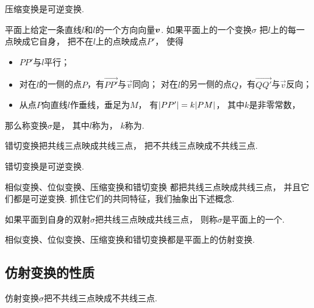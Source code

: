 \begin{proposition}
压缩变换是可逆变换.
\end{proposition}

\begin{definition}
平面上给定一条直线\(l\)和\(l\)的一个方向向量\(\boldsymbol{v}\).
如果平面上的一个变换\(\sigma\)
把\(l\)上的每一点映成它自身，
把不在\(l\)上的点映成点\(P'\)，
使得\begin{itemize}
	\item \(PP'\)与\(l\)平行；
	\item 对在\(l\)的一侧的点\(P\)，有\(\vec{PP'}\)与\(\vec{v}\)同向；
	对在\(l\)的另一侧的点\(Q\)，有\(\vec{QQ'}\)与\(\vec{v}\)反向；
	\item 从点\(P\)向直线\(l\)作垂线，垂足为\(M\)，
	有\(\abs{PP'} = k \abs{PM}\)，
	其中\(k\)是非零常数，
\end{itemize}
那么称变换\(\sigma\)是，
其中\(l\)称为，
\(k\)称为.
\end{definition}

\begin{proposition}
错切变换把共线三点映成共线三点，
把不共线三点映成不共线三点.
\end{proposition}

\begin{proposition}
错切变换是可逆变换.
\end{proposition}

相似变换、位似变换、压缩变换和错切变换
都把共线三点映成共线三点，
并且它们都是可逆变换.
抓住它们的共同特征，我们抽象出下述概念.
\begin{definition}
如果平面到自身的双射\(\sigma\)把共线三点映成共线三点，
则称\(\sigma\)是平面上的一个.
\end{definition}

相似变换、位似变换、压缩变换和错切变换都是平面上的仿射变换.

\subsection{仿射变换的性质}
\begin{property}
仿射变换\(\sigma\)把不共线三点映成不共线三点.
\end{property}

